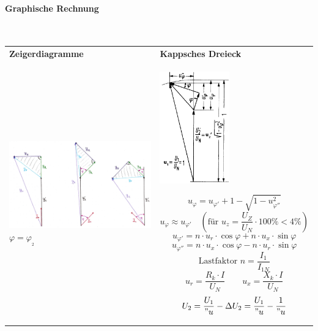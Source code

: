 		\paragraph{Graphische Rechnung}$\;$\\			\begin{tabular}{p{8cm}|p{10cm}}
	 			\textbf{Zeigerdiagramme} & \textbf{Kappsches Dreieck}\\
				\begin{minipage}{8cm}
	            	\includegraphics[width=8cm]{bilder/KappschesDreieck_1.png}
	            	$\varphi = \varphi_{_2} \qquad $
	            \end{minipage}  & \hspace{0.2cm}
				\begin{minipage}{10cm} 
		        	\begin{minipage}{2.5cm}
						\includegraphics[width=3cm]{bilder/KappschesDreieck.png}
		            \end{minipage}
					\begin{minipage}{7.5cm}
		      			$$u_{\varphi} = u_{\varphi'} + 1 - \sqrt{1 - u_{\varphi''}^2}$$
		      			$$ \boxed{u_\varphi \approx u_{\varphi'}}\quad (\text{für }u_z
		      			=\frac{U_Z}{U_{N}} \cdot 100\% < 4 \%)$$
		      			$$u_{\varphi'} = n \cdot u_r \cdot \cos \varphi + n \cdot u_x
		      			\cdot \sin \varphi$$ $$u_{\varphi''} = n \cdot u_x \cdot \cos \varphi - n \cdot u_r \cdot \sin \varphi$$
		      			$$\text{Lastfaktor } n = \frac{I_1}{I_{1N}}$$
		      			$$ u_r = \frac{R_k \cdot I}{U_N} \qquad u_x = \frac{X_k \cdot I}{U_N} $$
		      			$$ U_2 = \frac{U_1}{"u} - \Delta U_2 = \frac{U_1}{"u} - \frac{1}{"u}
$$
\end{minipage}
\end{minipage}
\end{tabular}
